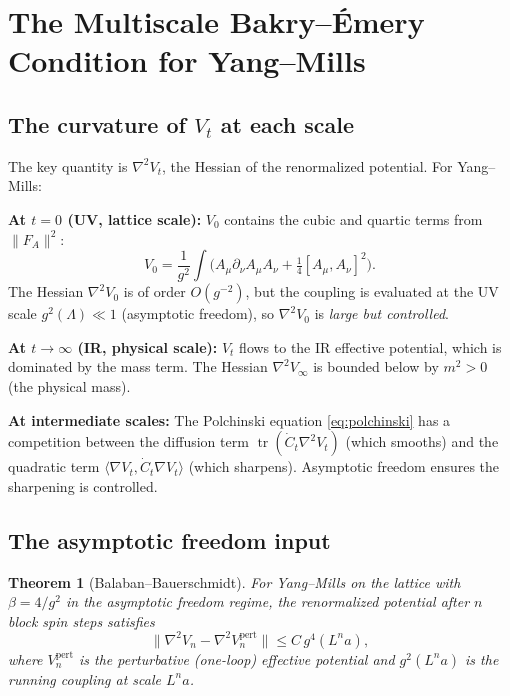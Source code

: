 \documentclass[11pt,a4paper]{article}
\theoremstyle{plain}
\newtheorem{theorem}{Theorem}[section]
\theoremstyle{definition}
\theoremstyle{remark}
\newcommand{\tr}{\operatorname{tr}}
\begin{document}
\section{The Multiscale Bakry--\'Emery Condition for Yang--Mills}

\subsection{The curvature of $V_t$ at each scale}

The key quantity is $\nabla^2 V_t$, the Hessian of the renormalized
potential. For Yang--Mills:

\textbf{At $t = 0$ (UV, lattice scale):}
$V_0$ contains the cubic and quartic terms from $\|F_A\|^2$:
\begin{equation}
  V_0 = \frac{1}{g^2}\int \bigl(A_\mu \partial_\nu A_\mu A_\nu
  + \tfrac{1}{4}[A_\mu, A_\nu]^2\bigr).
\end{equation}
The Hessian $\nabla^2 V_0$ is of order $O(g^{-2})$, but the coupling
is evaluated at the UV scale $g^2(\Lambda) \ll 1$ (asymptotic freedom),
so $\nabla^2 V_0$ is \emph{large but controlled}.

\textbf{At $t \to \infty$ (IR, physical scale):}
$V_t$ flows to the IR effective potential, which is dominated by
the mass term. The Hessian $\nabla^2 V_\infty$ is bounded below
by $m^2 > 0$ (the physical mass).

\textbf{At intermediate scales:}
The Polchinski equation \eqref{eq:polchinski} has a competition
between the diffusion term $\tr(\dot{C}_t \nabla^2 V_t)$ (which
smooths) and the quadratic term $\langle \nabla V_t, \dot{C}_t
\nabla V_t \rangle$ (which sharpens). Asymptotic freedom ensures
the sharpening is controlled.

\subsection{The asymptotic freedom input}

\begin{theorem}[Balaban--Bauerschmidt]\label{thm:UV}
For Yang--Mills on the lattice with $\beta = 4/g^2$ in the
asymptotic freedom regime, the renormalized potential after
$n$ block spin steps satisfies
\begin{equation}\label{eq:balaban}
  \|\nabla^2 V_n - \nabla^2 V_n^{\mathrm{pert}}\|
  \le C\,g^4(L^n a),
\end{equation}
where $V_n^{\mathrm{pert}}$ is the perturbative (one-loop)
effective potential and $g^2(L^n a)$ is the running coupling
at scale $L^n a$.
\end{theorem}
\end{document}
